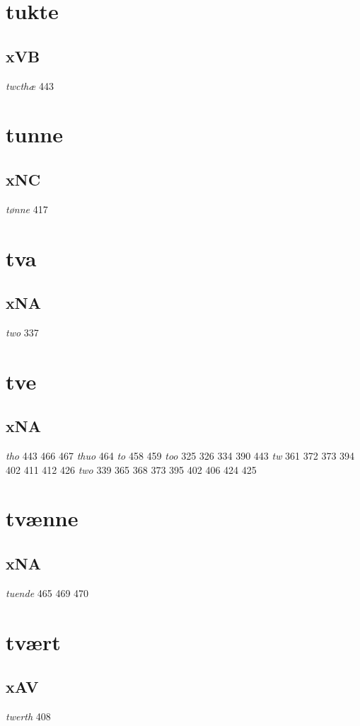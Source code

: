 \documentclass[a4paper,twocolumn]{article}
\begin{document}
\section{tukte}
\label{sec:org9b133e2}
\subsection{xVB}
\label{sec:org05179ab}
\emph{twcthæ} 443 
\section{tunne}
\label{sec:org7c371c6}
\subsection{xNC}
\label{sec:org7a8544a}
\emph{tønne} 417 
\section{tva}
\label{sec:org9178cf5}
\subsection{xNA}
\label{sec:orgf36f6d2}
\emph{two} 337 
\section{tve}
\label{sec:orgc036ca5}
\subsection{xNA}
\label{sec:orgb4b6b4b}
\emph{tho} 443 466 467 \emph{thuo} 464 \emph{to} 458 459 \emph{too} 325 326 334 390 443 \emph{tw} 361 372 373 394 402 411 412 426 \emph{two} 339 365 368 373 395 402 406 424 425 
\section{tvænne}
\label{sec:orgb2515d6}
\subsection{xNA}
\label{sec:org406f58b}
\emph{tuende} 465 469 470 
\section{tvært}
\label{sec:orgc28a450}
\subsection{xAV}
\label{sec:org2c76dfb}
\emph{twerth} 408 
\end{document}
